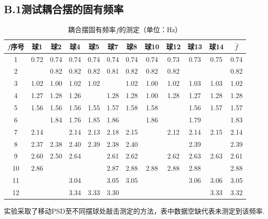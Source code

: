 \documentclass{ctexart}
\begin{document}
\subsection*{B.1\quad 测试耦合摆的固有频率}
 
\begin{table}[!htbp]
  \centering
  \caption{耦合摆固有频率$f$的测定（单位：Hz）}\vspace{0.3em} \label{tab:aStrangeTable}%
  \begin{tabular}{c|cccccccccc|c}
  \toprule
   $f$序号& 球1& 球2& 球4& 球5& 球7& 球8& 球10& 球12& 球13& 球14& $\bar{f}$\\
  \midrule
   1&0.72 	& 0.74 	& 0.74 & 	0.74 &	0.74 &	0.74 &	0.74 &	0.73 &	0.73 &	0.75& 0.74\\
   2&	      &0.82   &	0.82 & 	0.82 & 	0.81 &	0.82 &	0.82 &	0.82 &       &      &  0.82 \\
   3&1.02 	&1.00 	&1.02  &	1.02 &	     &  1.02 &  1.00 &  1.02 &  1.03 &  1.03 &1.02 \\
   4&1.27 	&1.28 	&1.26  &		   &1.28 	 &1.28 	 &1.00 	 &  1.28 &	1.27 &	1.28& 1.28   \\
   5&1.56 	&1.56 	&1.56  &1.55 	 &1.57 	 &1.58 	 &1.58 	 &       &1.56 	 &1.57& 1.57\\
   6&       &	1.84 	&1.76  &1.85 	 &1.86 	 &       &1.86   &   		 &1.79 	 &   &  1.83 \\
   7&2.14 	&	       &2.14 	&2.13 	 &  2.18 	 & 2.15 	&	    &    2.12 &	2.14 &	  2.15& 2.14 \\
   8&2.37 	&2.38 	&2.40  &2.39 	 &2.38 	 &2.40 	&        &       	&2.39 	&& 2.39 \\
   9&2.60 	&2.50 	&2.64 	&	&2.61 	&2.62 	& &	2.62 	&2.63 &	2.63& 2.61    \\
  10&2.86 	&	&	&	&2.87 	&2.88 	&2.88 	&2.88 	&2.88 	& &  2.88 \\
  11& &	 &	3.04 &		&3.05 	&3.05 	&	&	&3.06 	&3.06 & 3.05 \\
  12& & &	3.34 	&3.33 &	3.30 	& &	 &	 & &	3.33&  3.32 \\
  \bottomrule
  \end{tabular}
  \end{table}
\noindent 实验采取了移动PSD至不同摆球处敲击测定的方法，表中数据空缺代表未测定到该频率.
\end{document}

